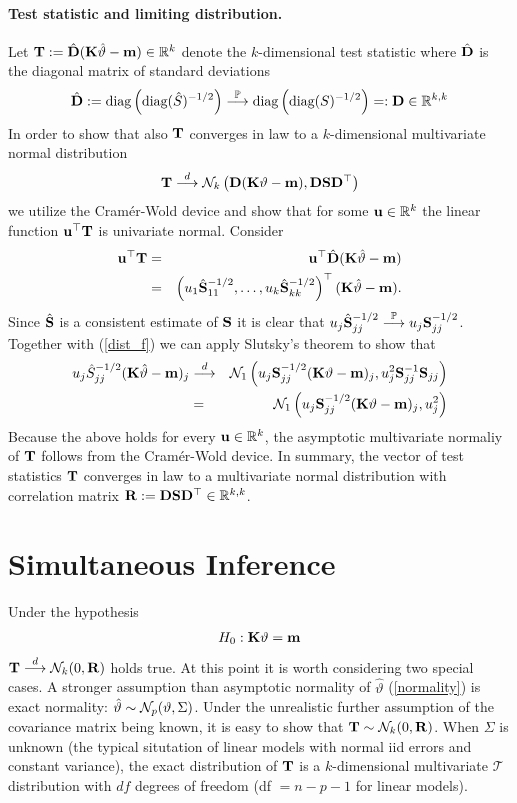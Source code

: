 \documentclass[12pt]{article}
\begin{document}
\paragraph{Test statistic and limiting distribution.}

Let $\T := \hat{\D} (\K \hat{\vartheta} - \m) \in \R^k$ denote
the $k$-dimensional test statistic where $\hat{\D}$ is the diagonal
matrix of standard deviations
\begin{eqnarray*}
\hat{\D} := \text{diag}\left(\text{diag}(\hat{S})^{-1/2}\right) \cP 
\text{diag}\left(\text{diag}(S)^{-1/2}\right) =: \D \in \R^{k,k}
\end{eqnarray*}
In order to show that also $\T$ converges in law to a $k$-dimensional multivariate
normal distribution
\begin{eqnarray*}
\T \cL \N_k\left(\D(\K \vartheta - \m), \D \S \D^\top\right)
\end{eqnarray*}
we utilize the Cram{\'e}r-Wold device and show that for some $\u \in \R^k$ 
the linear function $\u^\top \T$ is univariate normal. Consider
\begin{eqnarray*}
\u^\top \T & = & \u^\top \hat{\D} (\K \hat{\vartheta} - \m) \\
& = & \left(u_1 \hat{\S}_{11}^{-1/2}, \dots, u_k \hat{\S}_{kk}^{-1/2}\right)^\top(\K \hat{\vartheta} - \m).
\end{eqnarray*}
Since $\hat{\S}$ is a consistent estimate of $\S$ it 
is clear that $u_j \hat{\S}_{jj}^{-1/2} \cP u_j \S_{jj}^{-1/2}$.
Together with (\ref{dist_f}) we can apply Slutsky's theorem to show that
\begin{eqnarray*}
u_j \hat{S}_{jj}^{-1/2} (\K \hat{\vartheta} - \m)_j & \cL &  
\N_1\left(u_j \S_{jj}^{-1/2} (\K \vartheta - \m)_j, u_j^2 \S_{jj}^{-1} \S_{jj}\right) \\
& = & \N_1\left(u_j \S_{jj}^{-1/2} (\K \vartheta - \m)_j, u_j^2\right)
\end{eqnarray*}
Because the above holds for every $\u \in \R^k$, the asymptotic multivariate
normaliy of $\T$ follows from the Cram{\'e}r-Wold device. In summary,
the vector of test statistics $\T$ converges in law to a multivariate
normal distribution with correlation matrix $\Cor := \D \S \D^\top \in \R^{k,k}$.

\section{Simultaneous Inference}

Under the hypothesis
\begin{eqnarray*}
H_0: \K \vartheta = \m
\end{eqnarray*}
$\T \cL \N_k(0, \Cor)$ holds true. At this point it is worth
considering two special cases. A stronger assumption than asymptotic normality
of $\hat{\vartheta}$ (\ref{normality}) is exact normality:
$\hat{\vartheta} \sim \N_p(\vartheta, \Sigma)$. Under the unrealistic
further assumption of the covariance matrix being known, it
is easy to show that $\T \sim \N_k(0, \Cor)$. 
When $\Sigma$ is unknown (the typical situtation of linear models
with normal iid errors and constant variance), the
exact distribution of $\T$ is a $k$-dimensional multivariate $\mathcal{T}$
distribution with $df$ degrees of freedom (df $ = n - p - 1$ for linear models).
\end{document}
